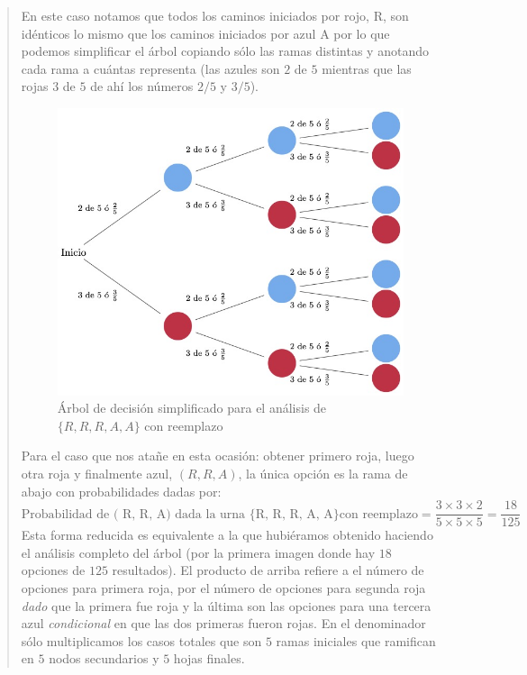 \documentclass[
]{book}
\begin{document}
\begin{quote}
En este caso notamos que todos los caminos iniciados por rojo, R, son idénticos lo mismo que los caminos iniciados por azul A por lo que podemos simplificar el árbol copiando sólo las ramas distintas y anotando cada rama a cuántas representa (las azules son \(2\) de \(5\) mientras que las rojas \(3\) de \(5\) de ahí los números \(2/5\) y \(3/5\)).

\begin{figure}
\centering
\includegraphics{./images/arbol_decision_2_1.jpeg}
\caption{Árbol de decisión simplificado para el análisis de \(\{ R, R, R, A, A\}\) con reemplazo}
\end{figure}

Para el caso que nos atañe en esta ocasión: obtener primero roja, luego otra roja y finalmente azul, \(( R, R, A)\), la única opción es la rama de abajo con probabilidades dadas por:
\[
\textrm{Probabilidad de ( R, R, A) dada la urna \{R, R, R, A, A\} con reemplazo}  = \dfrac{3 \times 3 \times 2}{5 \times 5 \times 5} = \dfrac{18}{125}
\]
Esta forma reducida es equivalente a la que hubiéramos obtenido haciendo el análisis completo del árbol (por la primera imagen donde hay \(18\) opciones de \(125\) resultados). El producto de arriba refiere a el número de opciones para primera roja, por el número de opciones para segunda roja \emph{dado} que la primera fue roja y la última son las opciones para una tercera azul \emph{condicional} en que las dos primeras fueron rojas. En el denominador sólo multiplicamos los casos totales que son \(5\) ramas iniciales que ramifican en \(5\) nodos secundarios y \(5\) hojas finales.


\end{quote}
\end{document}
